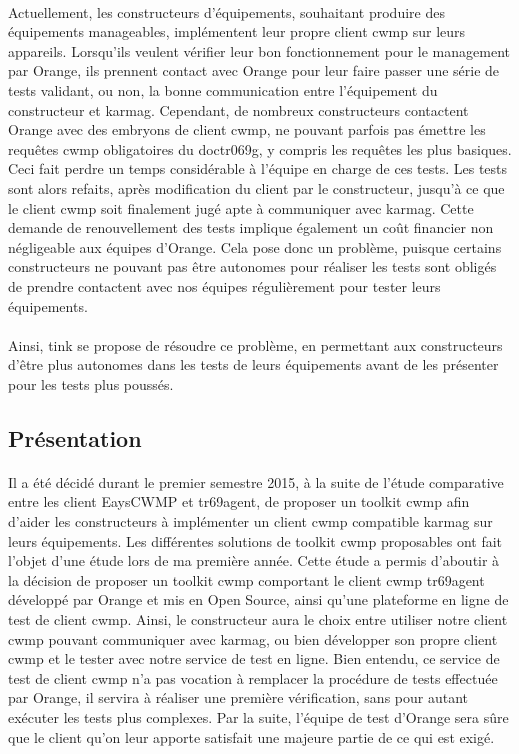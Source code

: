 \documentclass[12pt,a4paper]{report}
\begin{document}
\paragraph*{}Actuellement, les constructeurs d’équipements, souhaitant produire des
équipements manageables, implémentent leur propre client \gls{cwmp} sur leurs appareils. Lorsqu’ils veulent vérifier leur bon fonctionnement pour le management par Orange, ils prennent contact avec Orange pour leur faire passer une série de tests validant, ou non, la bonne communication entre l’équipement du constructeur et \gls{karmag}. Cependant, de nombreux constructeurs contactent Orange avec des embryons de client \gls{cwmp}, ne pouvant parfois pas émettre les requêtes \gls{cwmp} obligatoires du \gls{doctr069g}, y compris les requêtes les plus basiques. Ceci fait perdre un temps considérable à l’équipe en charge de ces tests. Les tests sont alors refaits, après modification du client par le constructeur, jusqu’à ce que le client \gls{cwmp} soit finalement jugé apte à communiquer avec \gls{karmag}. Cette demande de renouvellement des tests implique également un coût financier non négligeable aux équipes d’Orange. Cela pose donc un problème, puisque certains constructeurs ne pouvant pas être autonomes pour réaliser les tests sont obligés de prendre contactent avec nos équipes régulièrement pour tester leurs équipements.\\
\paragraph*{}Ainsi, \gls{tink} se propose de résoudre ce problème, en permettant aux
constructeurs d’être plus autonomes dans les tests de leurs équipements avant de les
présenter pour les tests plus poussés. \\
\subsection{Présentation}
\paragraph*{}Il a été décidé durant le premier semestre 2015, à la suite de l'étude comparative entre les client EaysCWMP et tr69agent, de proposer un toolkit \gls{cwmp}  afin d’aider les constructeurs à implémenter un client \gls{cwmp} compatible \gls{karmag} sur leurs équipements. Les différentes solutions de toolkit \gls{cwmp} proposables ont fait l’objet d’une étude lors de ma première année. Cette étude a permis d’aboutir à la décision de proposer un toolkit \gls{cwmp} comportant le client \gls{cwmp} tr69agent développé par Orange et mis en Open Source, ainsi qu’une plateforme en ligne de test de client \gls{cwmp}. Ainsi, le constructeur aura le choix entre utiliser notre client \gls{cwmp} pouvant communiquer avec \gls{karmag}, ou bien développer son propre client \gls{cwmp} et le tester avec notre service de test en ligne. Bien entendu, ce service de test de client \gls{cwmp} n’a pas vocation à remplacer la procédure de tests effectuée par Orange, il servira à réaliser une première vérification, sans pour autant exécuter les tests plus complexes. Par la suite, l’équipe de test d’Orange sera sûre que le client qu’on leur apporte satisfait une majeure partie de ce qui est exigé.
\end{document}
